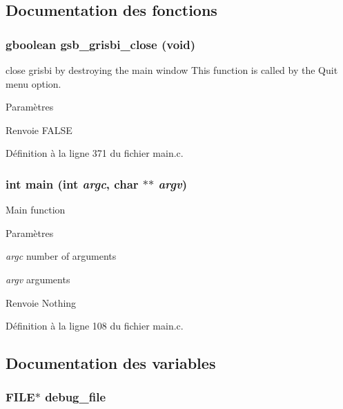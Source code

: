 \subsection{Documentation des fonctions}
\subsubsection[{gsb\_\-grisbi\_\-close}]{\setlength{\rightskip}{0pt plus 5cm}gboolean gsb\_\-grisbi\_\-close (void)}\label{main_8c_a4d6c21c259d467499784d537bccb61e5}
close grisbi by destroying the main window This function is called by the Quit menu option.


\begin{DoxyParams}{Paramètres}
\item[{\em }]\end{DoxyParams}
\begin{DoxyReturn}{Renvoie}
FALSE 
\end{DoxyReturn}


Définition à la ligne 371 du fichier main.c.

\subsubsection[{main}]{\setlength{\rightskip}{0pt plus 5cm}int main (int {\em argc}, \/  char $\ast$$\ast$ {\em argv})}\label{main_8c_a3c04138a5bfe5d72780bb7e82a18e627}
Main function


\begin{DoxyParams}{Paramètres}
\item[{\em argc}]number of arguments \item[{\em argv}]arguments\end{DoxyParams}
\begin{DoxyReturn}{Renvoie}
Nothing 
\end{DoxyReturn}


Définition à la ligne 108 du fichier main.c.



\subsection{Documentation des variables}
\subsubsection[{debug\_\-file}]{\setlength{\rightskip}{0pt plus 5cm}FILE$\ast$ {\bf debug\_\-file}}\label{main_8c_af5cc516f4d3c010da348387f6910a556}


